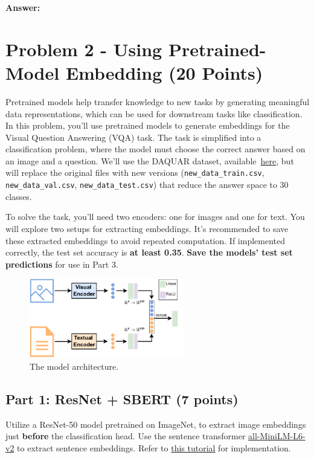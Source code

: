 \documentclass[11pt, oneside]{article}   	%
\begin{document}
\textbf{Answer:} \\




\section*{Problem 2 - Using Pretrained-Model Embedding (20 Points)}
Pretrained models help transfer knowledge to new tasks by generating meaningful data representations, which can be used for downstream tasks like classification.
In this problem, you'll use pretrained models to generate embeddings for the Visual Question Answering (VQA) task. The task is simplified into a classification problem, where the model must choose the correct answer based on an image and a question. We'll use the DAQUAR dataset, available~\href{https://www.kaggle.com/datasets/tezansahu/processed-daquar-dataset}{here}, but will replace the original files with new versions (\texttt{new\_data\_train.csv}, \texttt{new\_data\_val.csv}, \texttt{new\_data\_test.csv}) that reduce the answer space to 30 classes.

To solve the task, you’ll need two encoders: one for images and one for text. You will explore two setups for extracting embeddings. It's recommended to save these extracted embeddings to avoid repeated computation. If implemented correctly, the test set accuracy is \textbf{at least 0.35}. \textbf{Save the models' test set predictions} for use in Part 3.

\begin{figure}[h]
    \centering
  \includegraphics[width=0.6\textwidth]{images/model.pdf}
  \caption{The model architecture.}
  \label{fig:model}
\end{figure}

\subsection*{Part 1: ResNet + SBERT (7 points)}

Utilize a ResNet-50 model pretrained on ImageNet, to extract image embeddings just \textbf{before} the classification head. Use the sentence transformer \href{https://huggingface.co/sentence-transformers/all-MiniLM-L6-v2}{all-MiniLM-L6-v2} to extract sentence embeddings. Refer to \href{https://huggingface.co/sentence-transformers/all-MiniLM-L6-v2#usage-sentence-transformers}{this tutorial} for implementation.
\end{document}
